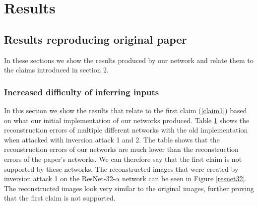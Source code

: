 \begin{table}[!htb]
\begin{minipage}{.5\linewidth}
{\begin{tabular}{l|c|c|c|c}
    \end{tabular}
    }
    
    \label{inversion-table}
    \end{minipage} 
\end{table}

\section{Results}
\label{sec:results}

\subsection{Results reproducing original paper}
In these sections we show the results produced by our network and relate them to the claims introduced in section 2.

\subsubsection{Increased difficulty of inferring inputs}
In this section we show the results that relate to the first claim (\ref{claim1}) based on what our initial implementation of our networks produced.
Table \ref{inversion-table} shows the reconstruction errors of multiple different networks with the old implementation when attacked with inversion attack 1 and 2. The table shows that the reconstruction errors of our networks are much lower than the reconstruction errors of the paper's networks. We can therefore say that the first claim is not supported by these networks.
The reconstructed images that were created by inversion attack 1 on the ResNet-32-$\alpha$ network can be seen in Figure \ref{resnet32}. The reconstructed images look very similar to the original images, further proving that the first claim is not supported.

